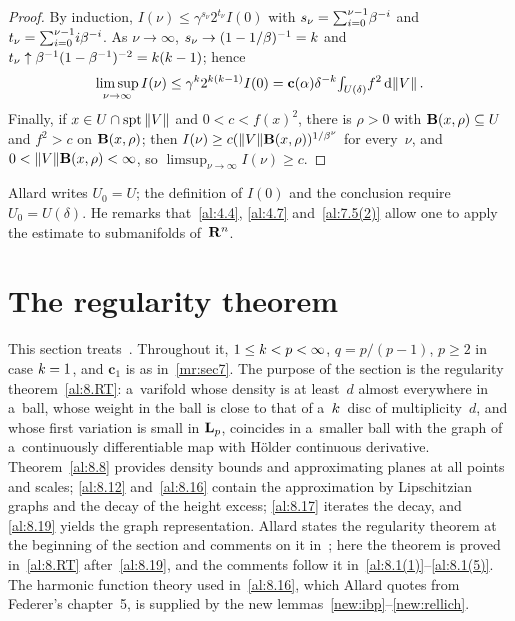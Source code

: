 \begin{proof}
    By induction, $I(\nu) \le \gamma^{s_\nu} 2^{t_\nu} I(0)$ with $s_\nu =
    {\textstyle\sum_{i=0}^{\nu-1}} \beta^{-i}$ and $t_\nu = {\textstyle\sum_{i=0}^{\nu-1}} i \beta^{-i}$. As $\nu \to
    \infty$, $s_\nu \to (1 - 1/\beta)^{-1} = k$ and $t_\nu \uparrow \beta^{-1} (1 -
    \beta^{-1})^{-2} = k(k-1)$; hence
    \begin{displaymath}
        \limsup_{\nu \to \infty} I(\nu) \le \gamma^{k} 2^{k(k-1)} I(0) =
        \mathbf{c}(\alpha) \delta^{-k} {\textstyle\int_{U(\delta)}^{}} f^2 \,\mathrm{d} \|V\| \,.
    \end{displaymath}
    Finally, if $x \in U \cap \operatorname{spt} \|V\|$ and $0 < c < f(x)^2$, there is $\rho > 0$ with
    $\mathbf{B}(x,\rho) \subseteq U$ and $f^2 > c$ on $\mathbf{B}(x,\rho)$; then $I(\nu) \ge c (\|V\|
    \mathbf{B}(x,\rho))^{1/\beta^\nu}$ for every~$\nu$, and $0 < \|V\| \mathbf{B}(x,\rho) < \infty$, so
    $\limsup_{\nu \to \infty} I(\nu) \ge c$.
\end{proof}

\begin{remark}
    \label{rem:7.5(6)}
    Allard writes $U_0 = U$; the definition of $I(0)$ and the conclusion require $U_0 =
    U(\delta)$. He remarks that~\ref{al:4.4}, \ref{al:4.7} and~\ref{al:7.5(2)} allow one to apply the
    estimate to submanifolds of~$\mathbf{R}^{n}$.
\end{remark}

\section{The regularity theorem}
\label{sec:regularity}

\begin{miniremark}
    \label{mr:sec8}
    This section treats~\cite[section~8]{Allard1972}. Throughout it, $1 \le k < p < \infty$,
    $q = p/(p-1)$, $p \ge 2$ in case $k = 1$, and $\mathbf{c}_1$ is as in~\ref{mr:sec7}. The
    purpose of the section is the regularity theorem~\ref{al:8.RT}: a~varifold whose density is
    at least~$d$ almost everywhere in a~ball, whose weight in the ball is close to that of
    a~$k$~disc of multiplicity~$d$, and whose first variation is small in $\mathbf{L}_{p}$, coincides
    in a~smaller ball with the graph of a~continuously differentiable map with H\"older
    continuous derivative. Theorem~\ref{al:8.8} provides density bounds and approximating planes
    at all points and scales; \ref{al:8.12} and~\ref{al:8.16} contain the approximation by
    Lipschitzian graphs and the decay of the height excess; \ref{al:8.17} iterates the decay, and
    \ref{al:8.19} yields the graph representation. Allard states the regularity theorem at the
    beginning of the section and comments on it in~\cite[8.1]{Allard1972}; here the theorem is
    proved in~\ref{al:8.RT} after~\ref{al:8.19}, and the comments follow it in~\ref{al:8.1(1)}--\ref{al:8.1(5)}.
    The harmonic function theory used in~\ref{al:8.16}, which Allard quotes from Federer's
    chapter~5, is supplied by the new lemmas~\ref{new:ibp}--\ref{new:rellich}.
\end{miniremark}

